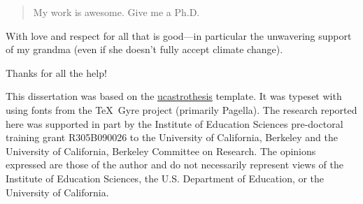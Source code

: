 \documentclass[12pt]{myucthesis}
\begin{document}
\ssp %
\hypersetup{pageanchor=false}

\maketitle
\copyrightpage

\begin{abstract}
My work is awesome. Give me a Ph.D.
\end{abstract}

\hypersetup{pageanchor=true}
\begin{frontmatter}

\begin{dedication}
\null\vfil
{\large
\begin{center}
With love and respect for all that is good---in particular the unwavering
support of my grandma (even if she doesn't fully accept climate change).
\end{center}}
\null\vfil
\end{dedication}

\tableofcontents
\listoffigures %
\listoftables %


\begin{acknowledgements}
Thanks for all the help!



This dissertation was based on the
\href{https://github.com/pkgw/ucastrothesis}{\textsf{ucastrothesis}} template.
It was typeset with  using fonts from the \TeX\ Gyre project
(primarily Pagella). The research reported here was supported in part by the
Institute of Education Sciences pre-doctoral training grant R305B090026 to the
University of California, Berkeley and the University of California, Berkeley
Committee on Research. The opinions expressed are those of the author and do not
necessarily represent views of the Institute of Education Sciences, the U.S.
Department of Education, or the University of California.

\end{acknowledgements}
\end{frontmatter}
\end{document}

